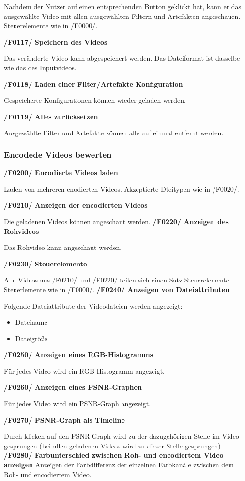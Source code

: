 \documentclass[parskip=full]{scrartcl}
\begin{document}
Nachdem der Nutzer auf einen entsprechenden Button geklickt hat, kann er das ausgewählte Video mit allen ausgewählten Filtern und Artefakten angeschauen. Steuerelemente wie in /F0000/.

\textbf{/F0117/ Speichern des Videos}

Das veränderte Video kann abgespeichert werden. Das Dateiformat ist dasselbe wie das des Inputvideos.

\textbf{/F0118/ Laden einer Filter/Artefakte Konfiguration}

Gespeicherte Konfigurationen können wieder geladen werden.

\textbf{/F0119/ Alles zurücksetzen}

Ausgewählte Filter und Artefakte können alle auf einmal entfernt werden.
\subsubsection{Encodede Videos bewerten}
\textbf{/F0200/ Encodierte Videos laden}

Laden von mehreren enodierten Videos. Akzeptierte Dteitypen wie in /F0020/.

\textbf{/F0210/ Anzeigen der encodierten Videos}

Die geladenen Videos können angeschaut werden.
\textbf{/F0220/ Anzeigen des Rohvideos}

Das Rohvideo kann angeschaut werden.

\textbf{/F0230/ Steuerelemente}

Alle Videos aus /F0210/ und /F0220/ teilen sich einen Satz Steuerelemente. Steuerlemente wie in /F0000/.
\newpage
\textbf{/F0240/ Anzeigen von Dateiattributen}

Folgende Dateiattribute der Videodateien werden angezeigt:
\begin{itemize}
\item Dateiname
\item Dateigröße
\end{itemize}

\textbf{/F0250/ Anzeigen eines RGB-Histogramms}

Für jedes Video wird ein RGB-Histogramm angezeigt.

\textbf{/F0260/ Anzeigen eines PSNR-Graphen}

Für jedes Video wird ein PSNR-Graph angezeigt.

\textbf{/F0270/ PSNR-Graph als Timeline}

Durch klicken auf den PSNR-Graph wird zu der dazugehörigen Stelle im Video gesprungen (bei allen geladenen Videos wird zu dieser Stelle gesprungen).
\textbf{/F0280/ Farbunterschied zwischen Roh- und encodiertem Video anzeigen}
Anzeigen der Farbdifferenz der einzelnen Farbkanäle zwischen dem Roh- und encodiertem Video.
\end{document}
